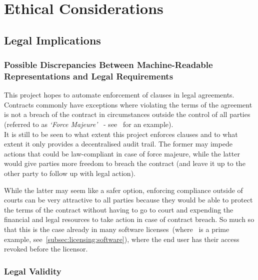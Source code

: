 
\chapter{Ethical Considerations}\label{ch:ethical}


\section{Legal Implications}\label{sec:legal-implications}

\subsection{Possible Discrepancies Between Machine-Readable Representations and Legal Requirements}
\label{subsec:legal-discrepancies}

This project hopes to automate enforcement of clauses in legal agreements.
Contracts commonly have exceptions where violating the terms of the agreement is not a breach of the
contract in circumstances outside the control of all parties (referred to as \textit{`Force
Majeure'}~\cite{forceMajeureDefinition} - see~\cite[]{jetbrainsEduLicence} for an
example).\\

It is still to be seen to what extent this project enforces clauses and to what extent it only
provides a decentralised audit trail.
The former may impede actions that could be law-compliant in case of force majeure, while the latter
would give parties more freedom to breach the contract (and leave it up to the other party to follow
up with legal action).

While the latter may seem like a safer option, enforcing compliance outside of courts can be very
attractive to all parties because they would be able to protect the terms of the contract without
having to go to court and expending the financial and legal resources to take action in case of
contract breach.
So much so that this is the case already in many software licenses~(where~\cite{jetbrainsEduLicence}
is a prime example, see~\ref{subsec:licensing:software}), where the end user has their access
revoked before the licensor.


\subsection{Legal Validity}

